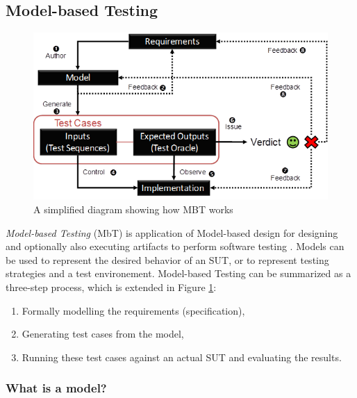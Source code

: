 \subsection{Model-based Testing}
\label{sec:related:testing:mbt}

\begin{figure}[ht]
    \begin{center}
    \includegraphics[width=1.0\linewidth]{figures/mbt.png}
    \end{center}

    \caption{A simplified diagram showing how MBT works}
    \label{fig:mbt}
\end{figure}

\textit{Model-based Testing} (MbT) is application of Model-based
design for designing and optionally also executing artifacts to
perform software testing \cite{Jorgensen:1995:STC:526521}.
Models can be used to represent the desired behavior of an SUT,
or to represent testing strategies and a test environement.
Model-based Testing can be summarized as a three-step process,
which is extended in Figure \ref{fig:mbt}:

\begin{enumerate}
\item Formally modelling the requirements (specification),

\item Generating test cases from the model,

\item Running these test cases against an actual SUT and
evaluating the results.
\end{enumerate}

\subsubsection{What is a model?}
\label{sec:related:testing:model}

